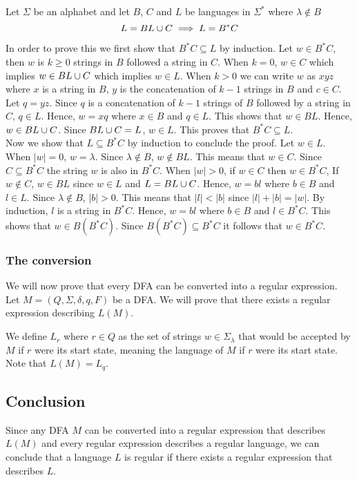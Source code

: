 \documentclass{article}
\newcommand{\emptyString}{\lambda}
\begin{document}
Let \(\Sigma\) be an alphabet and let \(B\), \(C\) and \(L\) be languages in \(\Sigma^*\) where \(\emptyString \notin B\)
\[
    L=BL\cup C \implies L=B^*C
\]

In order to prove this we first show that \(B^*C \subseteq L\) by induction.
Let \(w \in B^*C\), then \(w\) is \(k\geq 0\) strings in \(B\) followed a string in \(C\).
When \(k=0\), \(w \in C\) which implies \(w \in BL\cup C\) which implies \(w \in L\).
When \(k > 0\) we can write \(w\) as \(xyz\) where \(x\) is a string in \(B\),
\(y\) is the concatenation of \(k-1\) strings in \(B\) and \(c \in C\).
Let \(q=yz\). Since \(q\) is a concatenation of \(k-1\) strings of \(B\) followed by a string in \(C\),
\(q \in L\). Hence, \(w=xq\) where \(x\in B\) and \(q\in L\). This shows that \(w \in BL\).
Hence, \(w \in BL\cup C\). Since \(BL \cup C = L\), \(w \in L\). This proves that
\(B^*C\subseteq L\). \\
Now we show that \(L \subseteq B^*C\) by induction to conclude the proof.
Let \(w\in L\). When \(|w|=0\), \(w=\emptyString\). Since \(\emptyString \notin B\),
\(w \notin BL\). This means that \(w\in C\). Since \(C \subseteq B^*C\) the string \(w\)
is also in \(B^*C\). When \(|w| > 0\), if \(w \in C\) then \(w \in B^*C\),
If \(w \notin C\), \(w \in BL\) since \(w \in L\) and \(L=BL\cup C\).
Hence, \(w=bl\) where \(b\in B\) and \(l\in L\).
Since \(\emptyString \notin B\), \(|b|>0\). This means that \(|l|<|b|\)
since \(|l|+|b|=|w|\). By induction, \(l\) is a string in \(B^*C\).
Hence, \(w = bl\) where \(b\in B\) and \(l\in B^*C\). This shows that \(w \in B(B^*C)\).
Since \(B(B^*C) \subseteq B^*C\) it follows that \(w \in B^*C\).

\subsubsection{The conversion}

We will now prove that every DFA can be converted into a regular expression.
Let \(M=(Q, \Sigma, \delta, q, F)\) be a DFA. We will prove that there exists a regular
expression describing \(L(M)\).

We define \(L_r\) where \(r \in Q\) as the set of strings \(w \in \Sigma_\emptyString\)
that would be accepted by \(M\) if \(r\) were its start state, meaning the language of \(M\)
if \(r\) were its start state. Note that \(L(M)=L_q\).

\subsection{Conclusion}

Since any DFA \(M\) can be converted into a regular expression that describes \(L(M)\)
and every regular expression describes a regular language, we can conclude that a language \(L\)
is regular if there exists a regular expression that describes \(L\).
\end{document}
